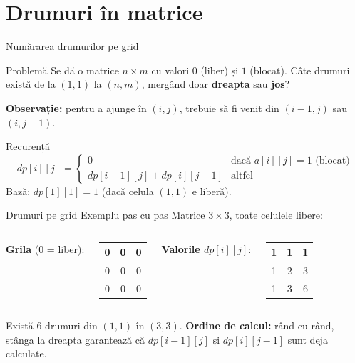 \documentclass{beamer}
\begin{document}
\section{Drumuri în matrice}

\begin{frame}{Numărarea drumurilor pe grid}
  \begin{block}{Problemă}
    Se dă o matrice $n \times m$ cu valori $0$ (liber) și $1$ (blocat).
    Câte drumuri există de la $(1,1)$ la $(n,m)$,
    mergând doar \textbf{dreapta} sau \textbf{jos}?
  \end{block}
  \smallskip
  \textbf{Observație:} pentru a ajunge în $(i, j)$, trebuie să fi venit din
  $(i-1, j)$ sau $(i, j-1)$.
  \begin{block}{Recurență}
    \[
      dp[i][j] = \begin{cases}
        0 & \text{dacă } a[i][j] = 1 \text{ (blocat)} \\
        dp[i-1][j] + dp[i][j-1] & \text{altfel}
      \end{cases}
    \]
    Bază: $dp[1][1] = 1$ (dacă celula $(1,1)$ e liberă).
  \end{block}
\end{frame}

\begin{frame}{Drumuri pe grid \textemdash{} Exemplu pas cu pas}
  Matrice $3 \times 3$, toate celulele libere:
  \smallskip
  \begin{columns}[T]
    \textbf{Grila} ($0$ = liber):
    \begin{center}
    \begin{tabular}{|c|c|c|}
      \hline
      0 & 0 & 0 \\ \hline
      0 & 0 & 0 \\ \hline
      0 & 0 & 0 \\ \hline
    \end{tabular}
    \end{center}
    \textbf{Valorile $dp[i][j]$}:
    \begin{center}
    \begin{tabular}{|c|c|c|}
      \hline
      1 & 1 & 1 \\ \hline
      1 & 2 & 3 \\ \hline
      1 & 3 & \alert{6} \\ \hline
    \end{tabular}
    \end{center}
  \end{columns}
  \smallskip
  Există \alert{6} drumuri din $(1,1)$ în $(3,3)$.
  \smallskip
  \textbf{Ordine de calcul:} rând cu rând, stânga la dreapta \textemdash{}
  garantează că $dp[i-1][j]$ și $dp[i][j-1]$ sunt deja calculate.
\end{frame}
\end{document}

